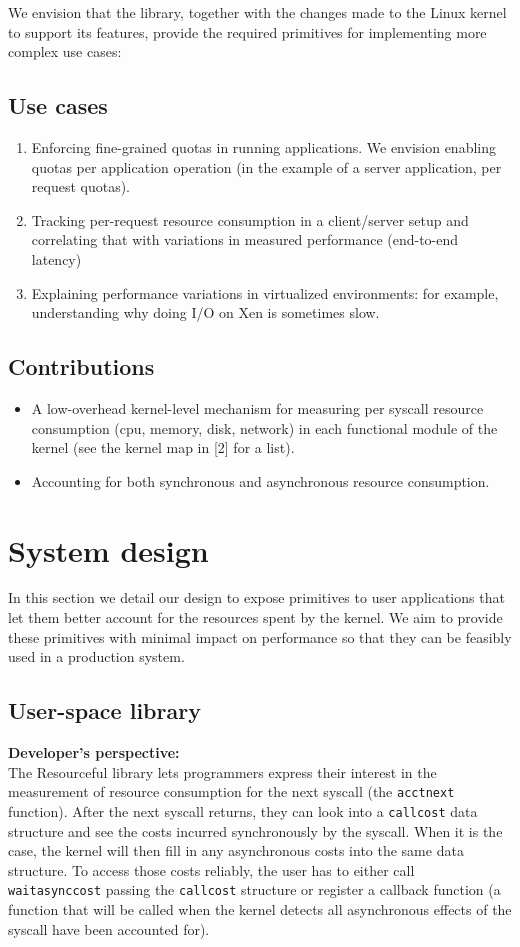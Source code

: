 \documentclass[12pt]{article}
\def\_{\textunderscore\-}
\begin{document}
We envision that the library, together with the changes made to the Linux kernel to support its features, provide the required primitives for implementing more complex use cases:

\subsection{Use cases}
\begin{enumerate}
\item Enforcing fine-grained quotas in running applications. We envision enabling quotas per application operation (in the example of a server application, per request quotas).
\item Tracking per-request resource consumption in a client/server setup and correlating that with variations in measured performance (end-to-end latency)
\item Explaining performance variations in virtualized environments: for example, understanding why doing I/O on Xen is sometimes slow.
\end{enumerate}


\subsection{Contributions}
\begin{itemize}
\item A low-overhead kernel-level mechanism for measuring per syscall resource consumption (cpu, memory, disk, network) in each functional module of the kernel (see the kernel map in [2] for a list).
\item Accounting for both synchronous and asynchronous resource consumption.
\end{itemize}


\section{System design}
 In this section we detail our design to expose primitives to user applications that let them better account for the resources spent by the kernel. We aim to provide these primitives with minimal impact on performance so that they can be feasibly used in a production system.

\subsection{User-space library}
\textbf{Developer’s perspective:\\}
The Resourceful library lets programmers express their interest in the measurement of resource consumption for the next syscall (the \texttt{acct\_next} function). After the next syscall returns, they can look into a \texttt{call\_cost} data structure and see the costs incurred synchronously by the syscall. When it is the case, the kernel will then fill in any asynchronous costs into the same data structure. To access those costs reliably, the user has to either call \texttt{wait\_async\_cost} passing the \texttt{call\_cost} structure or register a callback function (a function that will be called when the kernel detects all asynchronous effects of the syscall have been accounted for).
\end{document}
